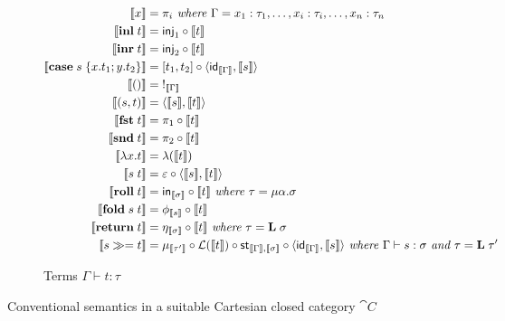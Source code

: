 \begin{figure}
\begin{subfigure}{\linewidth}
\begin{align*}
  \sem{x} &= \pi_i
  \textit{ where }\Gamma = x_1: \tau_1, \ldots, x_i: \tau_i, \ldots, x_n: \tau_n
  \\
  \sem{\tmInl{t}} &= \mathsf{inj}_1 \comp \sem{t}
  \\
  \sem{\tmInr{t}} &= \mathsf{inj}_2 \comp \sem{t}
  \\
  \sem{\tmCase{s}{x}{t_1}{y}{t_2}} &= \coprodM{t_1}{t_2} \comp \prodM{\id_{\sem{\Gamma}}}{\sem{s}}
  \\
  \sem{\tmUnit} &=\;!_{\sem{\Gamma}}
  \\
  \sem{\tmPair{s}{t}} &= \prodM{\sem{s}}{\sem{t}}
  \\
  \sem{\tmFst{t}} &= \pi_1 \comp \sem{t}
  \\
  \sem{\tmSnd{t}} &= \pi_2 \comp \sem{t}
  \\
  \sem{\tmFun{x}{t}} &= \lambda(\sem{t})
  \\
  \sem{\tmApp{s}{t}} &= \eval \comp \prodM{\sem{s}}{\sem{t}}
  \\
  \sem{\tmRoll{t}} &= \mathsf{in}_{\sem{\sigma}} \comp \sem{t}
  \textit{ where }\tau = \mu\alpha.\sigma
  \\
  \sem{\tmFold{s}{t}} &= \phi_{\sem{s}} \comp \sem{t}
  \\
  \sem{\tmReturn{t}} &= \eta_{\sem{\sigma}} \comp \sem{t}
  \textit{ where }\tau = \tyLift\;\sigma
  \\
  \sem{\tmBind{s}{t}} &= \mu_{\sem{\tau'}} \comp \mathcal{L}(\sem{t}) \comp \mathsf{st}_{\sem{\Gamma},\sem{\sigma}} \comp \prodM{\id_{\sem{\Gamma}}}{\sem{s}}
  \textit{ where }\Gamma \vdash s: \sigma\textit{ and }\tau = \tyLift\;\tau'
  \end{align*}
  \caption{Terms $\Gamma \vdash t: \tau$}
\end{subfigure}
\caption{Conventional semantics in a suitable Cartesian closed category $\cat{C}$}
\end{figure}

